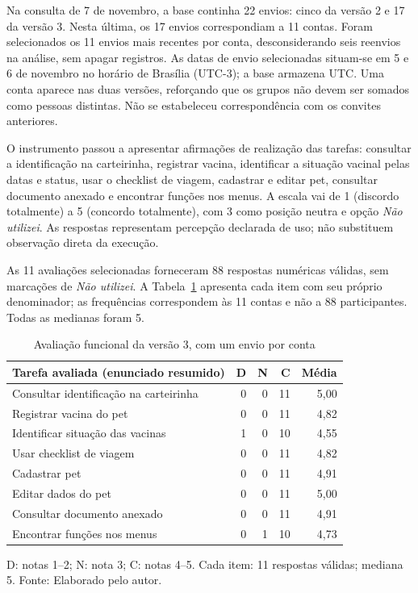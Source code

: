 \documentclass{UNESC}
\begin{document}
Na consulta de 7 de novembro, a base continha 22 envios: cinco da versão 2 e 17 da versão 3. Nesta última, os 17 envios correspondiam a 11 contas. Foram selecionados os 11 envios mais recentes por conta, desconsiderando seis reenvios na análise, sem apagar registros. As datas de envio selecionadas situam-se em 5 e 6 de novembro no horário de Brasília (UTC-3); a base armazena UTC. Uma conta aparece nas duas versões, reforçando que os grupos não devem ser somados como pessoas distintas. Não se estabeleceu correspondência com os convites anteriores.

O instrumento passou a apresentar afirmações de realização das tarefas: consultar a identificação na carteirinha, registrar vacina, identificar a situação vacinal pelas datas e status, usar o checklist de viagem, cadastrar e editar pet, consultar documento anexado e encontrar funções nos menus. A escala vai de 1 (discordo totalmente) a 5 (concordo totalmente), com 3 como posição neutra e opção \textit{Não utilizei}. As respostas representam percepção declarada de uso; não substituem observação direta da execução.

As 11 avaliações selecionadas forneceram 88 respostas numéricas válidas, sem marcações de \textit{Não utilizei}. A Tabela~\ref{tab:avaliacao_funcional_v3} apresenta cada item com seu próprio denominador; as frequências correspondem às 11 contas e não a 88 participantes. Todas as medianas foram 5.

\begin{table}[htbp]
\centering
\caption{Avaliação funcional da versão 3, com um envio por conta}
\label{tab:avaliacao_funcional_v3}
\small
\setlength{\tabcolsep}{4pt}
\renewcommand{\arraystretch}{1.15}
\begin{tabular}{@{}p{}rrrr@{}}
\hline
\textbf{Tarefa avaliada (enunciado resumido)} & \textbf{D} & \textbf{N} & \textbf{C} & \textbf{Média} \\
\hline
Consultar identificação na carteirinha & 0 & 0 & 11 & 5,00 \\
Registrar vacina do pet & 0 & 0 & 11 & 4,82 \\
Identificar situação das vacinas & 1 & 0 & 10 & 4,55 \\
Usar checklist de viagem & 0 & 0 & 11 & 4,82 \\
Cadastrar pet & 0 & 0 & 11 & 4,91 \\
Editar dados do pet & 0 & 0 & 11 & 5,00 \\
Consultar documento anexado & 0 & 0 & 11 & 4,91 \\
Encontrar funções nos menus & 0 & 1 & 10 & 4,73 \\
\hline
\end{tabular}
\par\vspace{2pt}
{\footnotesize\raggedright D: notas 1--2; N: nota 3; C: notas 4--5. Cada item: 11 respostas válidas; mediana 5. Fonte: Elaborado pelo autor.\par}
\end{table}
\end{document}
